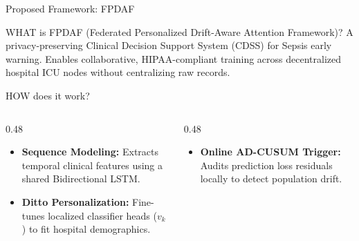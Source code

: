 \documentclass[aspectratio=169, 11pt]{beamer}
\begin{document}
\begin{frame}{Proposed Framework: FPDAF}
    \begin{block}{WHAT is FPDAF (Federated Personalized Drift-Aware Attention Framework)?}
        \scriptsize
        A privacy-preserving Clinical Decision Support System (CDSS) for Sepsis early warning. Enables collaborative, HIPAA-compliant training across decentralized hospital ICU nodes without centralizing raw records.
    \end{block}
    
    \begin{block}{HOW does it work?}
        \begin{columns}[t]
            \begin{column}{0.48\textwidth}
                \scriptsize
                \begin{itemize}
                    \item \textbf{Sequence Modeling:} Extracts temporal clinical features using a shared Bidirectional LSTM.
                    \item \textbf{Ditto Personalization:} Fine-tunes localized classifier heads ($v_k$) to fit hospital demographics.
                \end{itemize}
            \end{column}
            \begin{column}{0.48\textwidth}
                \scriptsize
                \begin{itemize}
                    \item \textbf{Online AD-CUSUM Trigger:} Audits prediction loss residuals locally to detect population drift.
                \end{itemize}
            \end{column}
        \end{columns}
    \end{block}
\end{frame}
\end{document}
